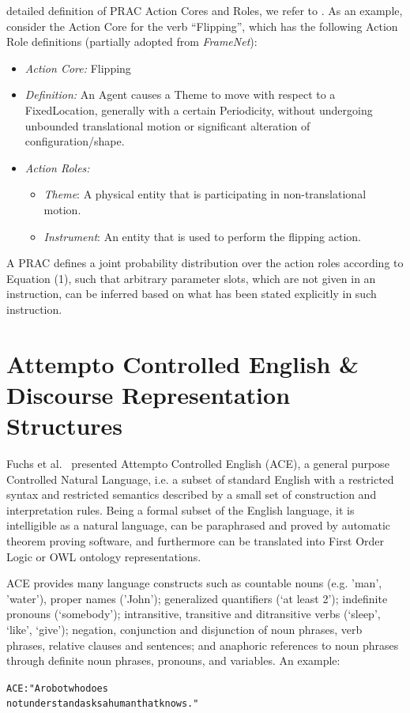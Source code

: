 \documentclass[oribibl]{llncs}
\begin{document}
detailed definition of PRAC Action Cores and Roles, we refer to \cite{nyga12actioncore}.
As an example, consider the Action Core for the verb ``Flipping'', which
has the following Action Role definitions (partially adopted from \emph{FrameNet}\cite{baker1998berkeley}):
\begin{itemize}
    \item \textit{Action Core:} Flipping
    \item \textit{Definition:} An Agent causes a Theme to move with respect to a FixedLocation, 
generally with a certain Periodicity, without undergoing unbounded translational 
motion or significant alteration of configuration/shape.
    \item \textit{Action Roles:}
    \begin{itemize}
        \item \textit{Theme}: A physical entity that is participating in non-translational motion.
        \item \textit{Instrument}: An entity that is used to perform the flipping action.
    \end{itemize}
\end{itemize}
A PRAC defines a joint probability distribution over the action roles
according to Equation (1), such that arbitrary parameter slots, which
are not given in an instruction, can be inferred based on what has been
stated explicitly in such instruction.  %

\section{Attempto Controlled English \& Discourse Representation Structures}

Fuchs et al.~\cite{fuchs:flairs2006} presented Attempto 
Controlled English (ACE), a general purpose Controlled Natural 
Language, i.e. a subset of standard English with a restricted syntax 
and restricted semantics described by a small set of construction 
and interpretation rules. Being a formal subset of the English 
language, it is intelligible as a natural language, can be 
paraphrased and proved by automatic theorem proving software, and 
furthermore can be translated into First Order Logic or OWL ontology 
representations.

ACE provides many language constructs such as countable nouns (e.g. 
'man', 'water'), proper names ('John'); generalized quantifiers (‘at 
least 2’); indefinite pronouns (‘somebody’); intransitive, 
transitive and ditransitive verbs (‘sleep’, ‘like’, ‘give’); 
negation, conjunction and disjunction of noun phrases, verb phrases, 
relative clauses and sentences; and anaphoric references to noun 
phrases through definite noun phrases, pronouns, and variables. An 
example: \begin{alltt}{\color{red} ACE:} \small"A robot who does 
not understand asks a human that knows."\end{alltt}
\end{document}

